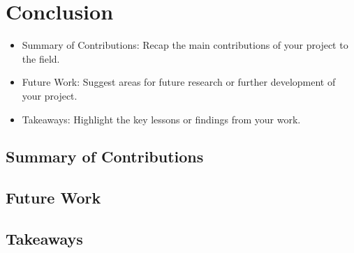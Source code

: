 
\section{Conclusion}


\begin{itemize}
    \item Summary of Contributions: Recap the main contributions of your project to the field.
    \item Future Work: Suggest areas for future research or further development of your project.
    \item Takeaways: Highlight the key lessons or findings from your work.
\end{itemize}








\subsection{Summary of Contributions}



\subsection{Future Work}




\subsection{Takeaways}




